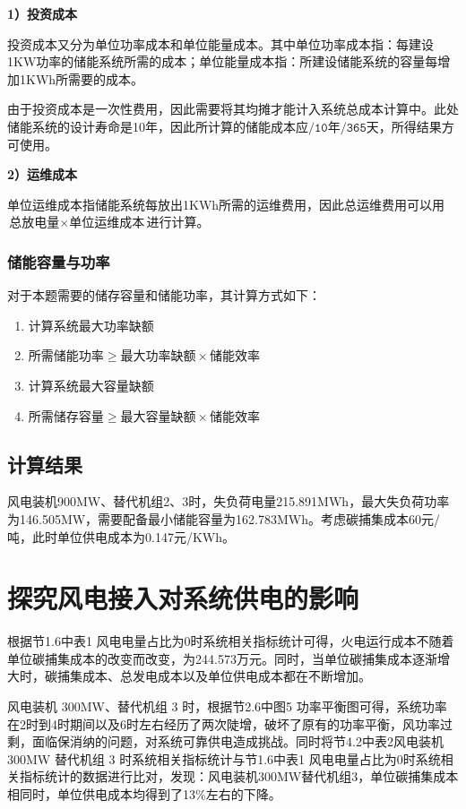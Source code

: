 \documentclass{cumcmthesis}
\begin{document}
	\textbf{1）投资成本}
	
	投资成本又分为单位功率成本和单位能量成本。其中单位功率成本指：每建设1KW功率的储能系统所需的成本；单位能量成本指：所建设储能系统的容量每增加1KWh所需要的成本。
	
	由于投资成本是一次性费用，因此需要将其均摊才能计入系统总成本计算中。此处储能系统的设计寿命是10年，因此所计算的储能成本应$ /\texttt{10年}/\texttt{365天} $，所得结果方可使用。
	
	\textbf{2）运维成本}
	
	单位运维成本指储能系统每放出1KWh所需的运维费用，因此总运维费用可以用$ \texttt{总放电量}\times \texttt{单位运维成本}$进行计算。
	
	\subsubsection{储能容量与功率}
	对于本题需要的储存容量和储能功率，其计算方式如下：
	
	\begin{enumerate}
		\item 计算系统最大功率缺额
		\item $ \texttt{所需储能功率}\geq \texttt{最大功率缺额}\times \texttt{储能效率}$
		\item 计算系统最大容量缺额
		\item  $ \texttt{所需储存容量} \geq \texttt{最大容量缺额}\times \texttt{储能效率}$
	\end{enumerate}
	
	
	\subsection{计算结果}
	
	风电装机900MW、替代机组2、3时，失负荷电量215.891MWh，最大失负荷功率为146.505MW，需要配备最小储能容量为162.783MWh。考虑碳捕集成本60元/吨，此时单位供电成本为0.147元/KWh。
	
	
	 \newpage
	\section{探究风电接入对系统供电的影响}
	
	根据节1.6中表1 风电电量占比为0时系统相关指标统计可得，火电运行成本不随着单位碳捕集成本的改变而改变，为244.573万元。同时，当单位碳捕集成本逐渐增大时，碳捕集成本、总发电成本以及单位供电成本都在不断增加。
	
	风电装机 300MW、替代机组 3 时，根据节2.6中图5 功率平衡图可得，系统功率在2时到4时期间以及6时左右经历了两次陡增，破坏了原有的功率平衡，风功率过剩，面临保消纳的问题，对系统可靠供电造成挑战。同时将节4.2中表2风电装机 300MW 替代机组 3 时系统相关指标统计与节1.6中表1 风电电量占比为0时系统相关指标统计的数据进行比对，发现：风电装机300MW替代机组3，单位碳捕集成本相同时，单位供电成本均得到了13\%左右的下降。
	
\end{document}
